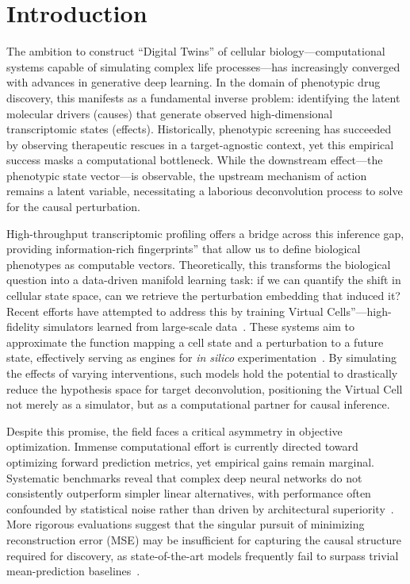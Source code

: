 \documentclass[conference]{IEEEtran}
\begin{document}
\section{Introduction}
The ambition to construct ``Digital Twins'' of cellular biology—computational systems capable of simulating complex life processes—has increasingly converged with advances in generative deep learning. In the domain of phenotypic drug discovery, this manifests as a fundamental inverse problem: identifying the latent molecular drivers (causes) that generate observed high-dimensional transcriptomic states (effects). Historically, phenotypic screening has succeeded by observing therapeutic rescues in a target-agnostic context, yet this empirical success masks a computational bottleneck. While the downstream effect—the phenotypic state vector—is observable, the upstream mechanism of action remains a latent variable, necessitating a laborious deconvolution process to solve for the causal perturbation.

High-throughput transcriptomic profiling offers a bridge across this inference gap, providing information-rich fingerprints'' that allow us to define biological phenotypes as computable vectors. Theoretically, this transforms the biological question into a data-driven manifold learning task: if we can quantify the shift in cellular state space, can we retrieve the perturbation embedding that induced it? Recent efforts have attempted to address this by training Virtual Cells''—high-fidelity simulators learned from large-scale data~\cite{roohani_virtual_2025}. These systems aim to approximate the function mapping a cell state and a perturbation to a future state, effectively serving as engines for \emph{in silico} experimentation~\cite{bunne_how_2024}. By simulating the effects of varying interventions, such models hold the potential to drastically reduce the hypothesis space for target deconvolution, positioning the Virtual Cell not merely as a simulator, but as a computational partner for causal inference.

Despite this promise, the field faces a critical asymmetry in objective optimization. Immense computational effort is currently directed toward optimizing forward prediction metrics, yet empirical gains remain marginal. Systematic benchmarks reveal that complex deep neural networks do not consistently outperform simpler linear alternatives, with performance often confounded by statistical noise rather than driven by architectural superiority~\cite{li_systematic_2024}. More rigorous evaluations suggest that the singular pursuit of minimizing reconstruction error (MSE) may be insufficient for capturing the causal structure required for discovery, as state-of-the-art models frequently fail to surpass trivial mean-prediction baselines~\cite{ahlmann-eltze_deep-learning-based_nodate}.
\end{document}
